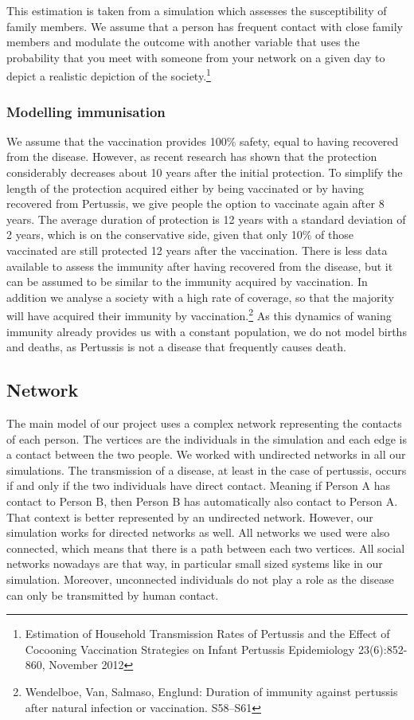 \documentclass[11pt]{article}
\begin{document}
This estimation is taken from a simulation which assesses the susceptibility of family members. We assume that a person has frequent contact with close family members and modulate the outcome with another variable that uses the probability that you meet with someone from your network on a given day to depict a realistic depiction of the society.\footnote{Estimation of Household Transmission Rates of Pertussis and the Effect of Cocooning Vaccination Strategies on Infant Pertussis Epidemiology 23(6):852-860, November 2012}
\vspace{14px}



\subsubsection{Modelling immunisation}
We assume that the vaccination provides 100\% safety, equal to having recovered from the disease. However, as recent research has shown that the protection considerably decreases about 10  years after the initial protection. 
To simplify the length of the protection acquired either by being vaccinated or by having recovered from Pertussis, we give people the option to vaccinate again after 8 years. The average duration of protection is 12 years with a standard deviation of 2 years, which is on the conservative side, given that only 10\% of those vaccinated are still protected 12 years after the vaccination. There is less data available to assess the immunity after having recovered from the disease, but it can be assumed to be similar to the immunity acquired by vaccination. In addition we analyse a society with a high rate of coverage, so that the majority will have acquired their immunity by vaccination.\footnote{Wendelboe, Van, Salmaso, Englund: Duration of immunity against pertussis after natural infection or vaccination. S58–S61} 
As this dynamics of waning immunity already provides us with a constant population, we do not model births and deaths, as Pertussis is not a disease that frequently causes death. 

\subsection{Network}

The main model of our project uses a complex network representing the contacts of each person. The vertices are the individuals in the simulation and each edge is a contact between the two people. We worked with undirected networks in all our simulations. The transmission of a disease, at least in the case of pertussis, occurs if and only if the two individuals have direct contact. Meaning if Person A has contact to Person B, then Person B has automatically also contact to Person A. That context is better represented by an undirected network. However, our simulation works for directed networks as well.
All networks we used were also connected, which means that there is a path between each two vertices. All social networks nowadays are that way, in particular small sized systems like in our simulation. Moreover, unconnected individuals do not play a role as the disease can only be transmitted by human contact.
\vspace{14px}
\end{document}

